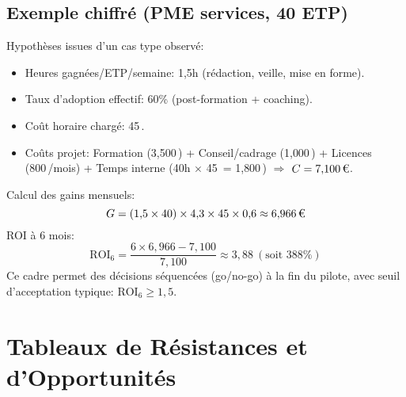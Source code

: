 \subsection{Exemple chiffré (PME services, 40 ETP)}
Hypothèses issues d'un cas type observé:
\begin{itemize}
    \item Heures gagnées/ETP/semaine: 1{,}5h (rédaction, veille, mise en forme).
    \item Taux d'adoption effectif: 60\% (post-formation + coaching).
    \item Coût horaire chargé: 45\,\texteuro{}.
    \item Coûts projet: Formation (3{,}500\,\texteuro) + Conseil/cadrage (1{,}000\,\texteuro) + Licences (800\,\texteuro/mois) + Temps interne (40h $\times$ 45\,\texteuro{} = 1{,}800\,\texteuro) $\Rightarrow$ $C = 7{,}100\,\text{\texteuro}$.
\end{itemize}
Calcul des gains mensuels:
\[
G = (1{,}5 \times 40) \times 4{,}3 \times 45 \times 0{,}6 \approx 6{,}966\,\text{\texteuro}
\]
ROI à 6 mois:
\[
\text{ROI}_{6} = \frac{6 \times 6{,}966 - 7{,}100}{7{,}100} \approx 3{,}88 \ (\text{soit } 388\%)
\]
Ce cadre permet des décisions séquencées (go/no-go) à la fin du pilote, avec seuil d'acceptation typique: $\text{ROI}_{6} \geq 1{,}5$.

\section{Tableaux de Résistances et d'Opportunités}
\label{sec:tables_res_op}
